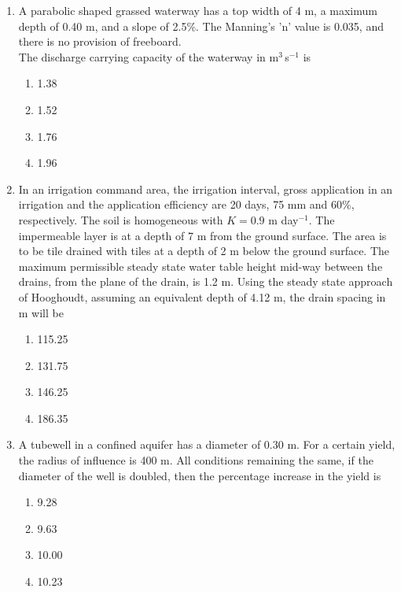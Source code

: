 \documentclass[journal]{IEEEtran}
\numberwithin{equation}{enumi}
\numberwithin{figure}{enumi}
\begin{document}
\begin{enumerate}
\item
A parabolic shaped grassed waterway has a top width of 4 m, a maximum depth of 0.40 m, and a slope of 2.5\%. The Manning's 'n' value is 0.035, and there is no provision of freeboard. \\
The discharge carrying capacity of the waterway in m$^3$\,s$^{-1}$ is
\hfill{}
\begin{multicols}{4}
    \begin{enumerate}
    \item 1.38
    \item 1.52
    \item 1.76
    \item 1.96
    \end{enumerate}
    \end{multicols}  





\item
In an irrigation command area, the irrigation interval, gross application in an irrigation and the application efficiency are 20 days, 75 mm and 60\%, respectively. The soil is homogeneous with $K=0.9$ m day$^{-1}$. The impermeable layer is at a depth of 7 m from the ground surface. The area is to be tile drained with tiles at a depth of 2 m below the ground surface. The maximum permissible steady state water table height mid-way between the drains, from the plane of the drain, is 1.2 m. Using the steady state approach of Hooghoudt, assuming an equivalent depth of 4.12 m, the drain spacing in m will be
\hfill{}
\begin{multicols}{2}
    \begin{enumerate}
    \item 115.25
    \item 131.75
    \item 146.25
    \item 186.35
    \end{enumerate}
    \end{multicols}  

    
\item
A tubewell in a confined aquifer has a diameter of 0.30 m. For a certain yield, the radius of influence is 400 m. All conditions remaining the same, if the diameter of the well is doubled, then the percentage increase in the yield is
\hfill{}
\begin{multicols}{4}
    \begin{enumerate}
    \item 9.28
    \item 9.63
    \item 10.00
    \item 10.23
    \end{enumerate}
    \end{multicols}  



\end{enumerate}
\end{document}
